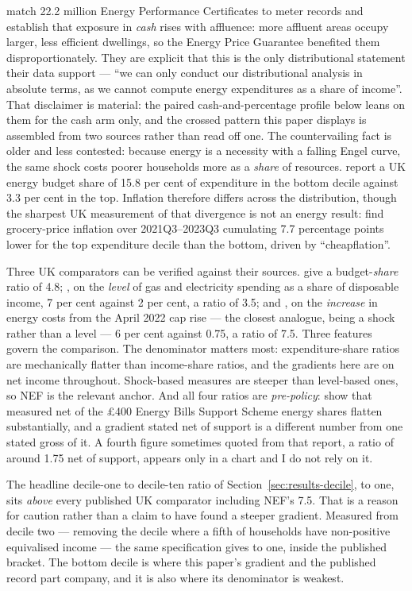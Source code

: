 \citet{fetzer2024} match 22.2 million Energy Performance Certificates to meter records and establish that exposure in \emph{cash} rises with affluence: more affluent areas occupy larger, less efficient dwellings, so the Energy Price Guarantee benefited them disproportionately. They are explicit that this is the only distributional statement their data support --- ``we can only conduct our distributional analysis in absolute terms, as we cannot compute energy expenditures as a share of income''. That disclaimer is material: the paired cash-and-percentage profile below leans on them for the cash arm only, and the crossed pattern this paper displays is assembled from two sources rather than read off one. The countervailing fact is older and less contested: because energy is a necessity with a falling Engel curve, the same shock costs poorer households more as a \emph{share} of resources. \citet{advani2013} report a UK energy budget share of 15.8 per cent of expenditure in the bottom decile against 3.3 per cent in the top. Inflation therefore differs across the distribution, though the sharpest UK measurement of that divergence is not an energy result: \citet{chen2024} find grocery-price inflation over 2021Q3--2023Q3 cumulating 7.7 percentage points lower for the top expenditure decile than the bottom, driven by ``cheapflation''.

Three UK comparators can be verified against their sources. \citet{advani2013} give a budget-\emph{share} ratio of 4.8; \citet{ons2022energyprices}, on the \emph{level} of gas and electricity spending as a share of disposable income, 7 per cent against 2 per cent, a ratio of 3.5; and \citet{nef2022}, on the \emph{increase} in energy costs from the April 2022 cap rise --- the closest analogue, being a shock rather than a level --- 6 per cent against 0.75, a ratio of 7.5. Three features govern the comparison. The denominator matters most: expenditure-share ratios are mechanically flatter than income-share ratios, and the gradients here are on net income throughout. Shock-based measures are steeper than level-based ones, so NEF is the relevant anchor. And all four ratios are \emph{pre-policy}: \citet{rf2022chilling} show that measured net of the \pounds 400 Energy Bills Support Scheme energy shares flatten substantially, and a gradient stated net of support is a different number from one stated gross of it. A fourth figure sometimes quoted from that report, a ratio of around 1.75 net of support, appears only in a chart and I do not rely on it.

The headline decile-one to decile-ten ratio of Section~\ref{sec:results-decile}, \genDecileRatioPct{} to one, sits \emph{above} every published UK comparator including NEF's 7.5. That is a reason for caution rather than a claim to have found a steeper gradient. Measured from decile two --- removing the decile where a fifth of households have non-positive equivalised income --- the same specification gives \genDecileRatioFromDecileTwoPct{} to one, inside the published bracket. The bottom decile is where this paper's gradient and the published record part company, and it is also where its denominator is weakest.

